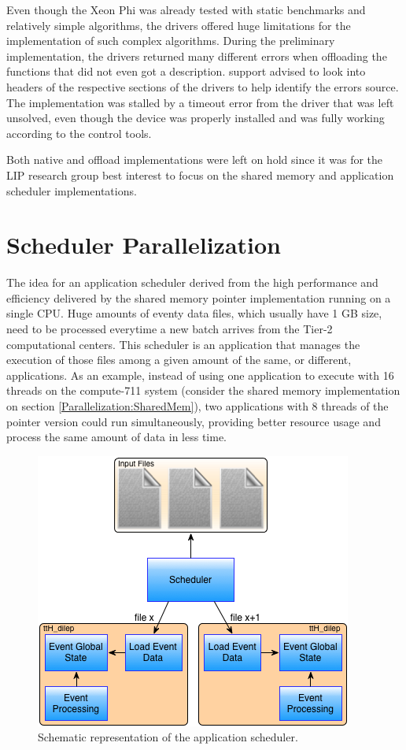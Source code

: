 Even though the Xeon Phi was already tested with static benchmarks and relatively simple algorithms, the drivers offered huge limitations for the implementation of such complex algorithms. During the preliminary implementation, the drivers returned many different errors when offloading the functions that did not even got a description. \intel support advised to look into headers of the respective sections of the drivers to help identify the errors source. The implementation was stalled by a timeout error from the driver that was left unsolved, even though the device was properly installed and was fully working according to the \intel control tools.

Both native and offload implementations were left on hold since it was for the LIP research group best interest to focus on the shared memory and application scheduler implementations.

\section{Scheduler Parallelization}
\label{Parallelization:Scheduler}

The idea for an application scheduler derived from the high performance and efficiency delivered by the shared memory pointer implementation running on a single CPU. Huge amounts of eventy data files, which usually have 1 GB size, need to be processed everytime a new batch arrives from the Tier-2 computational centers. This scheduler is an application that manages the execution of those files among a given amount of the same, or different, applications. As an example, instead of using one application to execute with 16 threads on the compute-711 system (consider the shared memory implementation on section \ref{Parallelization:SharedMem}), two applications with 8 threads of the pointer version could run simultaneously, providing better resource usage and process the same amount of data in less time.

\begin{figure}[!htp]
	\begin{center}
		\includegraphics[scale=0.7]{../../common/img/scheduler_workflow.png}
		\caption{Schematic representation of the application scheduler.}
		\label{fig:SchedulerWorkflow}
	\end{center}
\end{figure}

